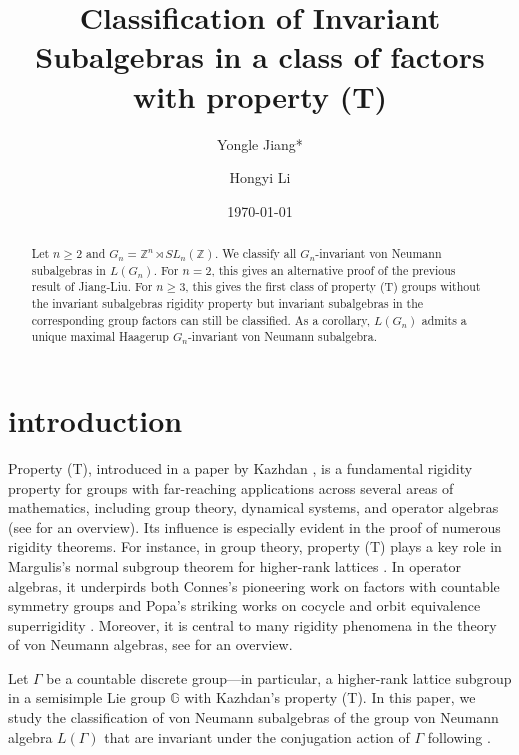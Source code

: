 \documentclass[12pt]{amsart}
\title[]{Classification of Invariant Subalgebras in a class of factors with property (T)}
\author{Yongle Jiang*}
\author{Hongyi Li}
\date{\today}
\theoremstyle{definition}
\theoremstyle{remark}
\begin{document}
\begin{abstract}
Let $n\geq 2$ and $G_n=\mathbb{Z}^n\rtimes SL_n(\mathbb{Z})$. We classify all $G_n$-invariant von Neumann subalgebras in $L(G_n)$. For $n=2$, this gives an alternative proof of the previous result of Jiang-Liu. For $n\geq 3$, this gives the first class of property (T) groups without the invariant subalgebras rigidity property but invariant subalgebras in the corresponding group factors can still be classified. As a corollary, $L(G_n)$ admits a unique maximal Haagerup $G_n$-invariant von Neumann subalgebra.
\end{abstract}






\maketitle


\section{introduction}

Property (T), introduced in a  paper by Kazhdan \cite{kazhdan_T}, is a fundamental rigidity property for groups with far-reaching applications across several areas of mathematics, including group theory, dynamical systems, and operator algebras (see \cite{bdv} for an overview).
Its influence is especially evident in the proof of numerous rigidity theorems. For instance, in group theory, property (T) plays a key role in Margulis’s normal subgroup theorem for higher-rank lattices \cite{Margulis_book}. In operator algebras, it underpirds both Connes's pioneering work on factors with countable symmetry groups \cite{connes_T} and  Popa's striking works on cocycle and orbit equivalence superrigidity \cites{popa_T1, popa_T2, popa_Tc}. Moreover, it is central to many rigidity phenomena in the theory of von Neumann algebras, see \cites{popa_icm, vaes_icm, ioana_icm, houdayer_icm} for an overview.


Let $\Gamma$ be a countable discrete group—in particular, a higher-rank lattice subgroup in a semisimple Lie group $\mathbb{G}$ with Kazhdan’s property (T). In this paper, we study the classification of von Neumann subalgebras of the group von Neumann algebra $L(\Gamma)$ that are invariant under the conjugation action of $\Gamma$ following \cites{ab,kp,cd}.
\end{document}
